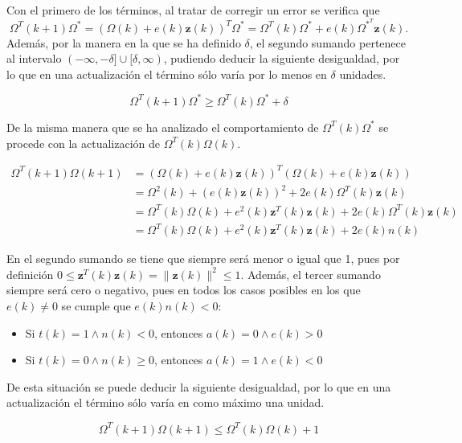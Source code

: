 		Con el primero de los términos, al tratar de corregir un error se verifica que
		$$
		\Omega^T(k+1)\Omega^* = (\Omega(k) + e(k)\textbf{z}(k))^T \Omega^* = \Omega^T(k)\Omega^* + e(k)\Omega^{*^T}\textbf{z}(k). 
		$$
		Además, por la manera en la que se ha definido $\delta$, el segundo sumando pertenece al intervalo $(-\infty, -\delta] \cup [\delta, \infty)$, pudiendo deducir la siguiente desigualdad, por lo que en una actualización el término sólo varía por lo menos en $\delta$ unidades.  
		
		\begin{equation}
			\label{eq:inf_delta}
			\Omega^T(k+1)\Omega^* \geq \Omega^T(k)\Omega^* + \delta
		\end{equation}
		
		De la misma manera que se ha analizado el comportamiento de $\Omega^T(k) \Omega^*$ se procede con la actualización de $\Omega^T(k)\Omega(k)$. 
		
		\begin{align*}
			\Omega^T(k+1)\Omega(k+1) &= (\Omega(k) + e(k)\textbf{z}(k))^T(\Omega(k) + e(k)\textbf{z}(k))\\
			&= \Omega^2(k) + (e(k)\textbf{z}(k))^2 + 2e(k)\Omega^T(k)\textbf{z}(k)\\
			&= \Omega^T(k)\Omega(k) + e^2(k)\textbf{z}^T(k)\textbf{z}(k) + 2e(k)\Omega^T(k)\textbf{z}(k)\\
			&= \Omega^T(k)\Omega(k) + e^2(k)\textbf{z}^T(k)\textbf{z}(k) + 2e(k)n(k)
		\end{align*}
		
		En el segundo sumando se tiene que siempre será menor o igual que 1, pues por definición $0 \leq \textbf{z}^T(k)\textbf{z}(k) = \|\textbf{z}(k)\|^2 \leq 1$. Además, el tercer sumando siempre será cero o negativo, pues en todos los casos posibles en los que $e(k) \neq 0$ se cumple que $e(k)n(k) < 0$: 
		
		\begin{itemize}
			\item Si $t(k) = 1 \land n(k) < 0$, entonces $a(k) = 0 \land e(k) > 0$
			\item Si $t(k) = 0 \land n(k) \geq 0$, entonces $a(k) = 1 \land e(k) < 0$
		\end{itemize}
		
		De esta situación se puede deducir la siguiente desigualdad, por lo que en una actualización el término sólo varía en como máximo una unidad.   
		
		\begin{equation}
			\label{eq:sup_delta}
			\Omega^T(k+1)\Omega(k+1) \leq \Omega^T(k)\Omega(k) + 1
		\end{equation}
		
